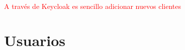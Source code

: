 \textcolor{red}{A través de Keycloak es sencillo adicionar nuevos clientes }



\section*{Usuarios}


%
